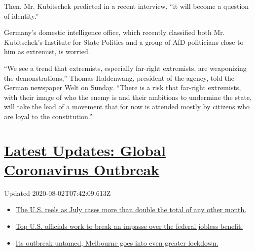 Then, Mr. Kubitschek predicted in a recent interview, ``it will become a
question of identity.''

Germany's domestic intelligence office, which recently classified both
Mr. Kubitschek's Institute for State Politics and a group of AfD
politicians close to him as extremist, is worried.

``We see a trend that extremists, especially far-right extremists, are
weaponizing the demonstrations,'' Thomas Haldenwang, president of the
agency, told the German newspaper Welt on Sunday. ``There is a risk that
far-right extremists, with their image of who the enemy is and their
ambitions to undermine the state, will take the lead of a movement that
for now is attended mostly by citizens who are loyal to the
constitution.''

\hypertarget{latest-updates-global-coronavirus-outbreak}{%
\section{\texorpdfstring{\href{https://www.nytimes.com/2020/08/01/world/coronavirus-covid-19.html?action=click\&pgtype=Article\&state=default\&region=MAIN_CONTENT_1\&context=storylines_live_updates}{Latest
Updates: Global Coronavirus
Outbreak}}{Latest Updates: Global Coronavirus Outbreak}}\label{latest-updates-global-coronavirus-outbreak}}

Updated 2020-08-02T07:42:09.613Z

\begin{itemize}
\tightlist
\item
  \href{https://www.nytimes.com/2020/08/01/world/coronavirus-covid-19.html?action=click\&pgtype=Article\&state=default\&region=MAIN_CONTENT_1\&context=storylines_live_updates\#link-34047410}{The
  U.S. reels as July cases more than double the total of any other
  month.}
\item
  \href{https://www.nytimes.com/2020/08/01/world/coronavirus-covid-19.html?action=click\&pgtype=Article\&state=default\&region=MAIN_CONTENT_1\&context=storylines_live_updates\#link-780ec966}{Top
  U.S. officials work to break an impasse over the federal jobless
  benefit.}
\item
  \href{https://www.nytimes.com/2020/08/01/world/coronavirus-covid-19.html?action=click\&pgtype=Article\&state=default\&region=MAIN_CONTENT_1\&context=storylines_live_updates\#link-2bc8948}{Its
  outbreak untamed, Melbourne goes into even greater lockdown.}
\end{itemize}

